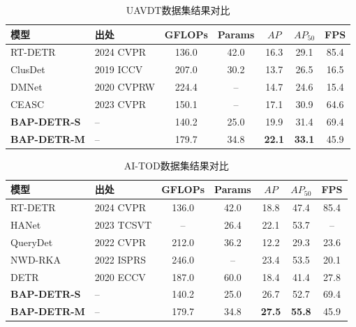 \begin{table}[t]
  \centering
  \caption{UAVDT数据集结果对比}
  \label{tab2}
  \begin{tabular*}{0.9\textwidth}{@{\extracolsep{\fill}}llccccc}
    \toprule
    模型 & 出处 & GFLOPs & Params & $AP$ & $AP_{50}$ & FPS\\
    \midrule
    RT-DETR \cite{Zhao202RTDETR} & 2024 CVPR & 136.0 & 42.0 & 16.3 & 29.1 & 85.4\\
    ClusDet \cite{Yang2019ClusteredOD} & 2019 ICCV & 207.0 & 30.2 & 13.7 & 26.5 & 16.5\\
    DMNet \cite{Li2020DMNet} & 2020 CVPRW & 224.4 & -- & 14.7 & 24.6  & 15.4\\
    CEASC \cite{Du2023CEASC} & 2023 CVPR & 150.1 & -- & 17.1 & 30.9  & 64.6\\
    \midrule
    \textbf{BAP-DETR-S} & -- & 140.2 & 25.0 & 19.9 & 31.4 & 69.4 \\
    \textbf{BAP-DETR-M} & -- & 179.7 & 34.8 & \textbf{22.1} & \textbf{33.1} & 45.9\\
    \bottomrule
  \end{tabular*}
\end{table}

\begin{table}[t]
  \centering
  \caption{AI-TOD数据集结果对比}
  \label{tab3}
  \begin{tabular*}{0.9\textwidth}{@{\extracolsep{\fill}}llccccc}
    \toprule
    模型 & 出处 & GFLOPs & Params & $AP$ & $AP_{50}$ & FPS\\
    \midrule
    RT-DETR \cite{Zhao202RTDETR} & 2024 CVPR & 136.0 & 42.0 & 18.8 & 47.4 & 85.4\\
    HANet \cite{Guo2024HAN} & 2023 TCSVT & -- & 26.4 & 22.1 & 53.7 & --\\
    QueryDet  \cite{Yang2022QueryDet} & 2022 CVPR & 212.0 & 36.2 & 12.2 & 29.3  & 23.6\\
    NWD-RKA \citep{Xu2022NWD} & 2022 ISPRS & 246.0 & -- & 23.4 & 53.5  & 20.1\\
    DETR  \citep{Carion2020DETR} & 2020 ECCV & 187.0 & 60.0 & 18.4 & 41.4  & 27.8\\
    \midrule
    \textbf{BAP-DETR-S} & -- & 140.2 & 25.0 & 26.7 & 52.7 & 69.4 \\
    \textbf{BAP-DETR-M} & -- & 179.7 & 34.8 & \textbf{27.5} & \textbf{55.8} & 45.9\\
    \bottomrule
  \end{tabular*}
\end{table}

